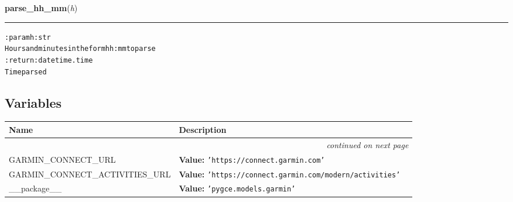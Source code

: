     \vspace{0.5ex}

\hspace{.8\funcindent}\begin{boxedminipage}{\funcwidth}

    \raggedright \textbf{parse\_hh\_mm}(\textit{h})

    \vspace{-1.5ex}

    \rule{\textwidth}{0.5\fboxrule}
\setlength{\parskip}{2ex}
\begin{alltt}

:param h: str
    Hours and minutes in the form hh:mm to parse
:return: datetime.time
    Time parsed
\end{alltt}

\setlength{\parskip}{1ex}
    \end{boxedminipage}



  \subsection{Variables}

    \vspace{-1cm}
\hspace{\varindent}\begin{longtable}{|p{\varnamewidth}|p{\vardescrwidth}|l}
\cline{1-2}
\cline{1-2} \centering \textbf{Name} & \centering \textbf{Description}& \\
\cline{1-2}
\endhead\cline{1-2}\multicolumn{3}{r}{\small\textit{continued on next page}}\\\endfoot\cline{1-2}
\endlastfoot\raggedright G\-A\-R\-M\-I\-N\-\_\-C\-O\-N\-N\-E\-C\-T\-\_\-U\-R\-L\- & \raggedright \textbf{Value:} 
{\tt \texttt{'}\texttt{https://connect.garmin.com}\texttt{'}}&\\
\cline{1-2}
\raggedright G\-A\-R\-M\-I\-N\-\_\-C\-O\-N\-N\-E\-C\-T\-\_\-A\-C\-T\-I\-V\-I\-T\-I\-E\-S\-\_\-U\-R\-L\- & \raggedright \textbf{Value:} 
{\tt \texttt{'}\texttt{https://connect.garmin.com/modern/activities}\texttt{'}}&\\
\cline{1-2}
\raggedright \_\-\_\-p\-a\-c\-k\-a\-g\-e\-\_\-\_\- & \raggedright \textbf{Value:} 
{\tt \texttt{'}\texttt{pygce.models.garmin}\texttt{'}}&\\
\cline{1-2}
\end{longtable}

